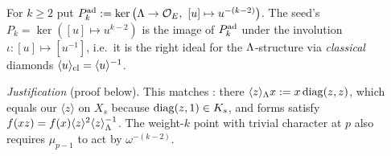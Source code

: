 \begin{definition}\label{def:s04-Pk}
For $k\ge2$ put $P^{\rm ad}_k:=\ker\big(\Lam\to\cOE,\ [u]\mapsto u^{-(k-2)}\big)$. The seed's $P_k=\ker([u]\mapsto u^{k-2})$ is the
image of $P^{\rm ad}_k$ under the involution $\iota:[u]\mapsto[u^{-1}]$, i.e.\ it is the right ideal for the $\Lambda$-structure via
\emph{classical} diamonds $\langle u\rangle_{\rm cl}=\langle u\rangle^{-1}$.
\end{definition}
\noindent\emph{Justification} \stproved{} (proof below). This matches
: there
$\langle z\rangle_\Lambda x:=x\,\mathrm{diag}(z,z)$, which equals our $\langle z\rangle$ on $X_s$ because $\mathrm{diag}(z,1)\in K_{s}$, and
forms satisfy $f(xz)=f(x)\langle z\rangle^2\langle z\rangle_\Lambda^{-1}$. The weight-$k$ point with trivial character at $p$ also requires
$\mu_{p-1}$ to act by $\omega^{-(k-2)}$.
